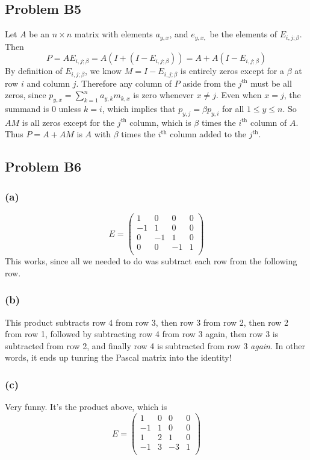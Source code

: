 \documentclass{article}
\begin{document}
\subsection{Problem B5}
Let $A$ be an $n\times n$ matrix with elements $a_{y,x}$, and $e_{y,x,}$ be the
elements of $E_{i,j;\beta}$.
Then 
\[P = AE_{i,j;\beta} = A(I + (I - E_{i,j;\beta})) = A + A(I - E_{i,j;\beta})\]
By definition of $E_{i,j;\beta}$, we know $M = I - E_{i,j;\beta}$ is entirely
zeros except for a $\beta$ at row $i$ and column $j$.
Therefore any column of $P$ aside from the $j^\textrm{th}$ must be all zeros,
since $p_{y,x} = \sum_{k=1}^n a_{y,k}m_{k,x}$ is zero whenever $x \neq j$.
Even when $x = j$, the summand is 0 unless $k = i$, which implies that $p_{y,j}
= \beta p_{y,i}$ for all $1 \leq y \leq n$.
So $AM$ is all zeros except for the $j^\textrm{th}$ column, which is $\beta$
times the $i^\textrm{th}$ column of $A$.
Thus $P = A + AM$ is $A$ with $\beta$ times the $i^\textrm{th}$ column added to
the $j^\textrm{th}$.

\subsection{Problem B6}
\subsubsection{(a)}
\[
E=\left( 
\begin{array}{cccc}
1 &0 &0 &0\\
-1&1 &0 &0\\
0 &-1&1 &0\\
0 &0 &-1&1\\
\end{array}
\right)
\]
This works, since all we needed to do was subtract each row from the following
row.
\subsubsection{(b)}
This product subtracts row 4 from row 3, then row 3 from row 2, then row 2 from
row 1, followed by subtracting row 4 from row 3 again, then row 3 is subtracted
from row 2, and finally row 4 is subtracted from row 3 \emph{again}.
In other words, it ends up tunring the Pascal matrix into the identity!
\subsubsection{(c)}
Very funny. It's the product above, which is 
\[
E=\left( 
\begin{array}{cccc}
1 &0 &0 &0\\
-1&1 &0 &0\\
1 &2 &1 &0\\
-1&3 &-3&1\\
\end{array}
\right)
\]
\end{document}
